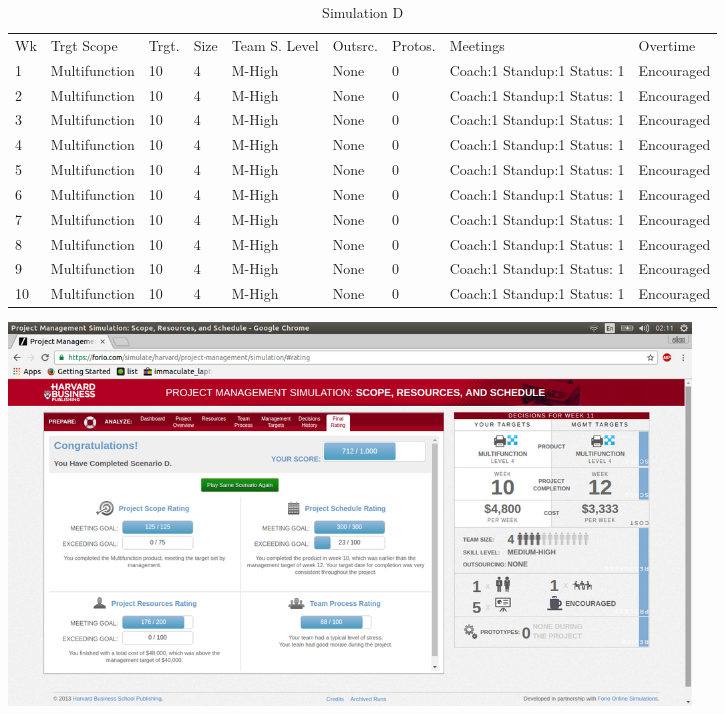 \documentclass{article}
\begin{document}
\begin{table}[H]
\centering
\caption{Simulation D}
\label{my-label}
\begin{tabular}{lllllllll}
Wk& Trgt Scope& Trgt.& Size& Team S. Level& Outsrc.& Protos.& Meetings                         & Overtime   \\
1  & Multifunction & 10                & 4         & M-High      & None        & 0       & Coach:1 Standup:1 Status: 1 & Encouraged \\
2  & Multifunction & 10                & 4         & M-High      & None        & 0       & Coach:1 Standup:1 Status: 1 & Encouraged \\
3  & Multifunction & 10                & 4         & M-High      & None        & 0       & Coach:1 Standup:1 Status: 1 & Encouraged \\
4  & Multifunction & 10                & 4         & M-High      & None        & 0       & Coach:1 Standup:1 Status: 1 & Encouraged \\
5  & Multifunction & 10                & 4         & M-High      & None        & 0       & Coach:1 Standup:1 Status: 1 & Encouraged \\
6  & Multifunction & 10                & 4         & M-High      & None        & 0       & Coach:1 Standup:1 Status: 1 & Encouraged \\
7  & Multifunction & 10                & 4         & M-High      & None        & 0       & Coach:1 Standup:1 Status: 1 & Encouraged \\
8  & Multifunction & 10                & 4         & M-High      & None        & 0       & Coach:1 Standup:1 Status: 1 & Encouraged \\
9  & Multifunction & 10                & 4         & M-High      & None        & 0       & Coach:1 Standup:1 Status: 1 & Encouraged \\
10 & Multifunction & 10                & 4         & M-High      & None        & 0       & Coach:1 Standup:1 Status: 1 & Encouraged
\end{tabular}
\end{table}
\includegraphics[height=4in]{sim_c.png}
\end{document}
